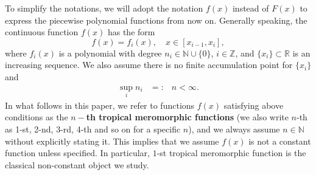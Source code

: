 \documentclass{article}
\begin{document}
To simplify the notations, we will adopt the notation $f(x)$ instead of $F(x)$ to express the piecewise polynomial functions from now on. Generally speaking, the continuous function $f(x)$ has the form
\begin{equation*}
    f(x)=f_{i}(x), \quad x\in [x_{i-1}, x_{i}],
\end{equation*}
where $f_{i}(x)$ is a polynomial with degree $n_{i}\in\mathbb{N}\cup\{0\}$, $i\in \mathbb{Z}$, and $\{x_{i}\}\subset\mathbb{R}$ is an increasing sequence. We also assume there is no finite accumulation point for $\{x_{i}\}$ and
\begin{eqnarray*}
    \sup\limits_{i}n_{i}&=:&n<\infty.
\end{eqnarray*}
In what follows in this paper, we refer to  functions $f(x)$ satisfying above conditions as the \textbf{$n-$th tropical meromorphic functions} (we also write $n$-th as 1-st, 2-nd, 3-rd, 4-th and so on for a specific $n$), and we always assume $n\in\mathbb{N}$ without explicitly stating it. This implies that we assume $f(x)$ is not a constant function unless  specified. In particular, $1$-st tropical meromorphic function is the classical non-constant object we study.
\end{document}
